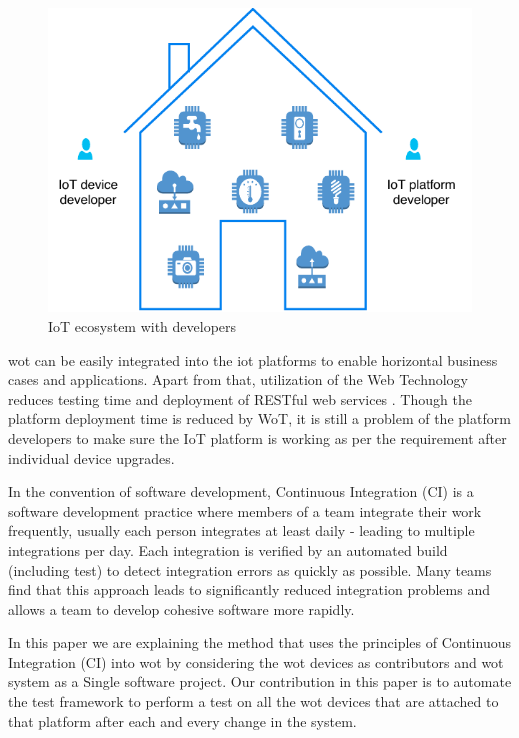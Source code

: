 \documentclass[conference]{IEEEtran}
\theoremstyle{definition}
\begin{document}
\begin{figure}[t]
  \centerline{\includegraphics[scale=0.6]{iotSystem} }
  
  \caption{IoT ecosystem with developers}
  \label{fig:Architecture}
\end{figure}

\ac{wot} can be easily integrated into the \ac{iot} platforms to enable horizontal business cases and applications. 
Apart from that, utilization of the Web Technology reduces testing time and deployment of RESTful web services \cite{datta2018advances}.
Though the platform deployment time is reduced by WoT, it is still a problem of the platform developers to make sure the IoT platform is working as per the requirement after individual device upgrades.

In the convention of software development, Continuous Integration (CI) is a software development practice where members of a team integrate their work frequently, usually each person integrates at least daily - leading to multiple integrations per day. 
Each integration is verified by an automated build (including test) to detect integration errors as quickly as possible. Many teams find that this approach leads to significantly reduced integration problems and allows a team to develop cohesive software more rapidly.\cite{fowler2006continuous}

In this paper we are explaining the method that uses the principles of Continuous Integration (CI) into \ac{wot} by considering the \ac{wot} devices as contributors and \ac{wot} system as a Single software project. 
Our contribution in this paper is to automate the test framework to perform a test on all the \ac{wot} devices that are attached to that platform after each and every change in the system.
\end{document}
